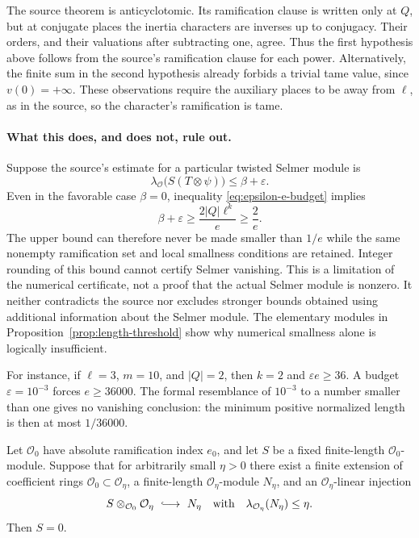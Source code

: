 The source theorem is anticyclotomic. Its ramification clause is written
only at $Q$, but at conjugate places the inertia characters are inverses
up to conjugacy. Their orders, and their valuations after subtracting
one, agree. Thus the first hypothesis above follows from the source's
ramification clause for each power. Alternatively, the finite sum in
the second hypothesis already forbids a trivial tame value, since
$v(0)=+\infty$. These observations require the auxiliary places to be
away from $\ell$, as in the source, so the character's ramification is
tame.

\paragraph{What this does, and does not, rule out.}
Suppose the source's estimate for a particular twisted Selmer module is
\[
 \lambda_{\mathcal O}\bigl(S(T\otimes\psi)\bigr)\leq\beta+\varepsilon.
\]
Even in the favorable case $\beta=0$, inequality
\eqref{eq:epsilon-e-budget} implies
\[
 \beta+\varepsilon\geq\frac{2|Q|\ell^k}{e}\geq\frac2e.
\]
The upper bound can therefore never be made smaller than $1/e$ while
the same nonempty ramification set and local smallness conditions are
retained. Integer rounding of this bound cannot certify Selmer
vanishing. This is a limitation of the numerical certificate, not a
proof that the actual Selmer module is nonzero. It neither contradicts
the source nor excludes stronger bounds obtained using additional
information about the Selmer module. The elementary modules in
Proposition~\ref{prop:length-threshold} show why numerical smallness
alone is logically insufficient.

For instance, if $\ell=3$, $m=10$, and $|Q|=2$, then $k=2$ and
$\varepsilon e\geq36$. A budget $\varepsilon=10^{-3}$ forces
$e\geq36000$. The formal resemblance of $10^{-3}$ to a number smaller
than one gives no vanishing conclusion: the minimum positive
normalized length is then at most $1/36000$.

\begin{proposition}
\label{prop:fixed-module-descent}
Let $\mathcal O_0$ have absolute ramification index $e_0$, and let
$S$ be a fixed finite-length $\mathcal O_0$-module. Suppose that for
arbitrarily small $\eta>0$ there exist a finite extension of coefficient
rings $\mathcal O_0\subset\mathcal O_\eta$, a finite-length
$\mathcal O_\eta$-module $N_\eta$, and an $\mathcal O_\eta$-linear injection
\[
 S\otimes_{\mathcal O_0}\mathcal O_\eta\ \lhook\joinrel\longrightarrow\ N_\eta
 \quad\text{with}\quad
 \lambda_{\mathcal O_\eta}(N_\eta)\leq\eta.
\]
Then $S=0$.
\end{proposition}

